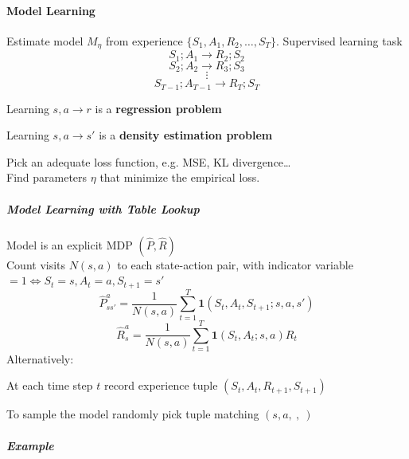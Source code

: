 \documentclass[10pt]{report}
\begin{document}
\paragraph{Model Learning} Estimate model $M_\eta$ from experience $\{S_1,A_1,R_2,\ldots,S_T\}$. Supervised learning task 
$$S_1;A_1\rightarrow R_2;S_2$$
$$S_2;A_2\rightarrow R_3;S_3$$
$$\vdots$$
$$S_{T-1};A_{T-1}\rightarrow R_T;S_T$$
\begin{list}{}{}
	\item Learning $s,a\rightarrow r$ is a \textbf{regression problem}
	\item Learning $s,a\rightarrow s'$ is a \textbf{density estimation problem}
\end{list}
Pick an adequate loss function, e.g. MSE, KL divergence\ldots\\
Find parameters $\eta$ that minimize the empirical loss.
\subparagraph{Model Learning with Table Lookup} Model is an explicit MDP $(\hat{P},\hat{R})$\\
Count visits $N(s,a)$ to each state-action pair, with indicator variable $=1\Leftrightarrow S_t=s, A_t=a, S_{t+1}=s'$
$$\hat{P}_{ss'}^a=\frac{1}{N(s,a)}\sum_{t=1}^T\mathbf{1}(S_t,A_t,S_{t+1};s,a,s')$$
$$\hat{R}_s^a=\frac{1}{N(s,a)}\sum_{t=1}^T\mathbf{1}(S_t,A_t;s,a)R_t$$
Alternatively:
\begin{list}{}{}
	\item At each time step $t$ record experience tuple $(S_t,A_t,R_{t+1},S_{t+1})$
	\item To sample the model randomly pick tuple matching $(s,a,\:,\:)$
\end{list}
\subparagraph{Example} 
\end{document}

